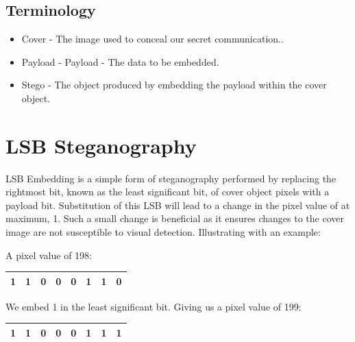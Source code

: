 \documentclass{l4proj}
\begin{document}
\subsection{Terminology}
\begin{itemize}
    \item Cover - The image used to conceal our secret communication..
    \item Payload - Payload - The data to be embedded.
    \item Stego -  The object produced by embedding the payload within the cover object.
\end{itemize}

\section{LSB Steganography}

LSB Embedding \citep{article} is a simple form of steganography performed by replacing the rightmost bit, known as the least significant bit, of cover object pixels with a payload bit. Substitution of this LSB will lead to a change in the pixel value of at maximum, 1. Such a small change is beneficial as it ensures changes to the cover image are not susceptible to visual detection. Illustrating with an example:

A pixel value of 198:
\begin{table}[!h]
\begin{tabular}{|l|l|l|l|l|l|l|l|}
\hline
1 & 1 & 0 & 0 & 0 & 1 & 1 & 0 \\ \hline
\end{tabular}
\end{table}

We embed 1 in the least significant bit. Giving us a pixel value of 199:

\begin{table}[!h]
\begin{tabular}{|l|l|l|l|l|l|l|l|}
\hline
1 & 1 & 0 & 0 & 0 & 1 & 1 & 1 \\ \hline
\end{tabular}
\end{table}
\end{document}
